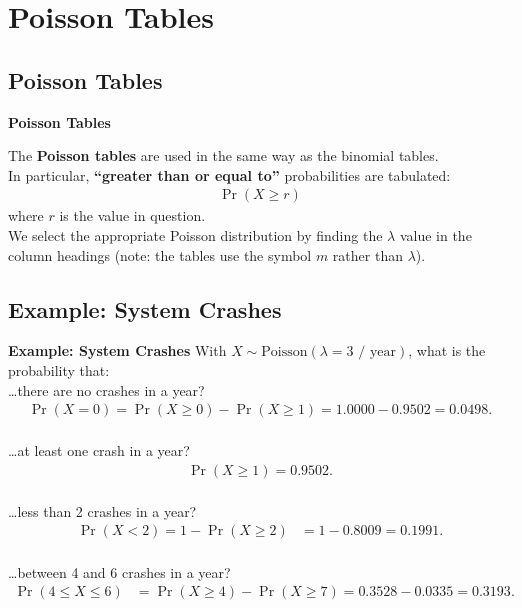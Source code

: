 \documentclass[compress]{beamer}        %
\makeatletter
\newcommand{\tcb}{\textcolor{beamer@blendedblue}}
\makeatother
\begin{document}
\section{Poisson Tables}
\subsection{Poisson Tables}
\begin{frame}{\bf \tcb{Poisson Tables}}

The {\bf Poisson tables} are used in the same way as the binomial tables.\\[1cm]

In particular, {\bf ``greater than or equal to''} probabilities are tabulated:
\begin{align*}
\boxed{\Pr(X \ge r)}
\end{align*}
where $r$ is the value in question.\\[1cm]

We select the appropriate Poisson distribution by finding the $\lambda$ value in the column headings (note: the tables use the symbol $m$ rather than $\lambda$).
\end{frame}


\subsection{Example: System Crashes}
\begin{frame}{\bf \tcb{Example: System Crashes}}\label{poisexampletab}
With $X \sim \text{Poisson}(\lambda=3 \text{ / year})$, what is the probability that:\\[0.4cm]

\ldots there are no crashes in a year?
\begin{align*}
\Pr(X=0) = \Pr(X \ge 0) - \Pr(X \ge 1) = 1.0000 - 0.9502 = 0.0498.\\[-0.1cm]
\end{align*}

\ldots at least one crash in a year?
\begin{align*}
\Pr(X\ge1) = 0.9502.\\[-0.1cm]
\end{align*}

\ldots less than 2 crashes in a year?
\begin{align*}
\Pr(X<2) = 1 - \Pr(X\ge2) &= 1 - 0.8009 = 0.1991.\\[-0.1cm]
\end{align*}

\ldots between 4 and 6 crashes in a year?
\begin{align*}
\Pr(4\le X \le 6) &= \Pr(X \ge 4) - \Pr(X \ge 7) = 0.3528 - 0.0335 = 0.3193.
\end{align*}

\end{frame}
\end{document}
